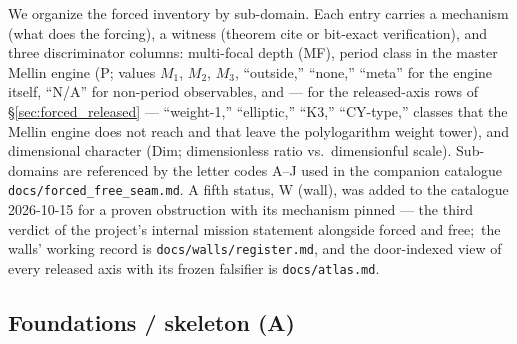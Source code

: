\documentclass[11pt,a4paper]{article}
\theoremstyle{plain}
\theoremstyle{definition}
\begin{document}
We organize the forced inventory by sub-domain. Each entry carries a mechanism (what does the forcing), a witness (theorem cite or bit-exact verification), and three discriminator columns:  multi-focal depth (MF), period class in the master Mellin engine (P; values $M_1$, $M_2$, $M_3$, ``outside,'' ``none,'' ``meta'' for the engine itself, ``N/A'' for non-period observables, and --- for the released-axis rows of \S\ref{sec:forced_released} --- ``weight-1,'' ``elliptic,'' ``K3,'' ``CY-type,'' classes that the Mellin engine does not reach and that leave the polylogarithm weight tower), and dimensional character (Dim; dimensionless ratio vs.\ dimensionful scale). Sub-domains are referenced by the letter codes A--J used in the companion catalogue \texttt{docs/forced\_free\_seam.md}. A fifth status, W (wall), was added to the catalogue 2026-10-15 for a proven obstruction with its mechanism pinned --- the third verdict of the project's internal mission statement alongside forced and free;\ the walls' working record is \texttt{docs/walls/register.md}, and the door-indexed view of every released axis with its frozen falsifier is \texttt{docs/atlas.md}.

\subsection{Foundations / skeleton (A)}
\label{sec:forced_foundations}
\end{document}
